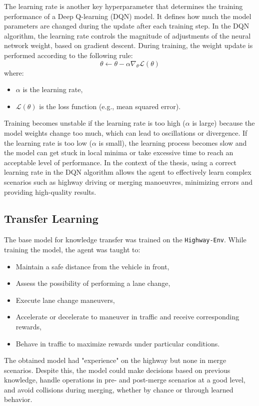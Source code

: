 The learning rate is another key hyperparameter that determines the training performance of a Deep Q-learning (DQN) model. It defines how much the model parameters are changed during the update after each training step. In the DQN algorithm, the learning rate controls the magnitude of adjustments of the neural network weight, based on gradient descent. During training, the weight update is performed according to the following rule:
\[
\theta \leftarrow \theta - \alpha \nabla_\theta \mathcal{L}(\theta)
\]
where:
\begin{itemize}
    \item $\alpha$ is the learning rate,
    \item $\mathcal{L}(\theta)$ is the loss function (e.g., mean squared error).
\end{itemize}

Training becomes unstable if the learning rate is too high ($\alpha$ is large) because the model weights change too much, which can lead to oscillations or divergence. If the learning rate is too low ($\alpha$ is small), the learning process becomes slow and the model can get stuck in local minima or take excessive time to reach an acceptable level of performance. In the context of the thesis, using a correct learning rate in the DQN algorithm allows the agent to effectively learn complex scenarios such as highway driving or merging manoeuvres, minimizing errors and providing high-quality results.

\subsection{Transfer Learning}

The base model for knowledge transfer was trained on the \texttt{Highway-Env}. While training the model, the agent was taught to:
\begin{itemize}
    \item Maintain a safe distance from the vehicle in front,
    \item Assess the possibility of performing a lane change,
    \item Execute lane change maneuvers,
    \item Accelerate or decelerate to maneuver in traffic and receive corresponding rewards,
    \item Behave in traffic to maximize rewards under particular conditions.
\end{itemize}

The obtained model had "experience" on the highway but none in merge scenarios. Despite this, the model could make decisions based on previous knowledge, handle operations in pre- and post-merge scenarios at a good level, and avoid collisions during merging, whether by chance or through learned behavior. 

